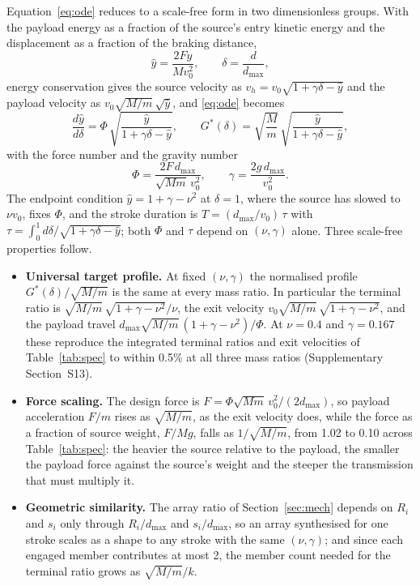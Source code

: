 \documentclass[preprint,12pt,number]{elsarticle}
\newcommand{\Gstar}{G^{*}}
\newcommand{\dmax}{d_{\max}}
\begin{document}
Equation~\eqref{eq:ode} reduces to a scale-free form in two dimensionless groups. With the payload energy as a fraction of the source's entry kinetic energy and the displacement as a fraction of the braking distance,
\begin{equation}
\hat y = \frac{2Fy}{M v_0^2}, \qquad \delta = \frac{d}{\dmax},
\label{eq:hatdefs}
\end{equation}
energy conservation gives the source velocity as $v_h = v_0\sqrt{1 + \gamma\delta - \hat y}$ and the payload velocity as $v_0\sqrt{M/m}\,\sqrt{\hat y}$, and \eqref{eq:ode} becomes
\begin{equation}
\frac{d\hat y}{d\delta} = \Phi\,\sqrt{\frac{\hat y}{1 + \gamma\delta - \hat y}}, \qquad
\Gstar(\delta) = \sqrt{\frac{M}{m}}\,\sqrt{\frac{\hat y}{1 + \gamma\delta - \hat y}},
\label{eq:dimless}
\end{equation}
with the force number and the gravity number
\begin{equation}
\Phi = \frac{2F\,\dmax}{\sqrt{Mm}\,v_0^2}, \qquad \gamma = \frac{2g\,\dmax}{v_0^2}.
\label{eq:groups}
\end{equation}
The endpoint condition $\hat y = 1 + \gamma - \nu^2$ at $\delta = 1$, where the source has slowed to $\nu v_0$, fixes $\Phi$, and the stroke duration is $T = (\dmax/v_0)\,\tau$ with $\tau = \int_0^1 d\delta/\sqrt{1 + \gamma\delta - \hat y}$; both $\Phi$ and $\tau$ depend on $(\nu, \gamma)$ alone. Three scale-free properties follow.

\begin{itemize}
\item \textbf{Universal target profile.} At fixed $(\nu, \gamma)$ the normalised profile $\Gstar(\delta)/\sqrt{M/m}$ is the same at every mass ratio. In particular the terminal ratio is $\sqrt{M/m}\,\sqrt{1 + \gamma - \nu^2}/\nu$, the exit velocity $v_0\sqrt{M/m}\,\sqrt{1 + \gamma - \nu^2}$, and the payload travel $\dmax\sqrt{M/m}\,(1 + \gamma - \nu^2)/\Phi$. At $\nu = 0.4$ and $\gamma = 0.167$ these reproduce the integrated terminal ratios and exit velocities of Table~\ref{tab:spec} to within 0.5\% at all three mass ratios (Supplementary Section~S13).
\item \textbf{Force scaling.} The design force is $F = \Phi\sqrt{Mm}\,v_0^2/(2\dmax)$, so payload acceleration $F/m$ rises as $\sqrt{M/m}$, as the exit velocity does, while the force as a fraction of source weight, $F/Mg$, falls as $1/\sqrt{M/m}$, from 1.02 to 0.10 across Table~\ref{tab:spec}: the heavier the source relative to the payload, the smaller the payload force against the source's weight and the steeper the transmission that must multiply it.
\item \textbf{Geometric similarity.} The array ratio of Section~\ref{sec:mech} depends on $R_i$ and $s_i$ only through $R_i/\dmax$ and $s_i/\dmax$, so an array synthesised for one stroke scales as a shape to any stroke with the same $(\nu, \gamma)$; and since each engaged member contributes at most 2, the member count needed for the terminal ratio grows as $\sqrt{M/m}/k$.
\end{itemize}
\end{document}
